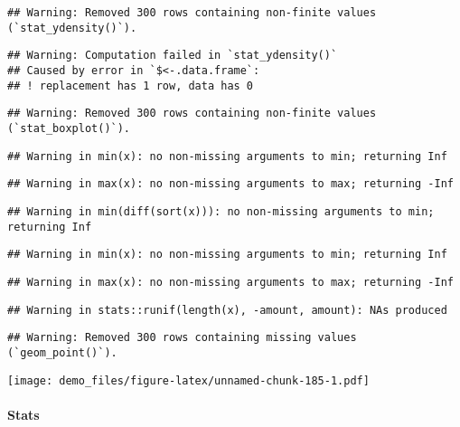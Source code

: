 \documentclass[]{book}
\let\oldparagraph\paragraph
\renewcommand{\paragraph}[1]{\oldparagraph{#1}\mbox{}}
\begin{document}
\begin{verbatim}
## Warning: Removed 300 rows containing non-finite values (`stat_ydensity()`).
\end{verbatim}

\begin{verbatim}
## Warning: Computation failed in `stat_ydensity()`
## Caused by error in `$<-.data.frame`:
## ! replacement has 1 row, data has 0
\end{verbatim}

\begin{verbatim}
## Warning: Removed 300 rows containing non-finite values (`stat_boxplot()`).
\end{verbatim}

\begin{verbatim}
## Warning in min(x): no non-missing arguments to min; returning Inf
\end{verbatim}

\begin{verbatim}
## Warning in max(x): no non-missing arguments to max; returning -Inf
\end{verbatim}

\begin{verbatim}
## Warning in min(diff(sort(x))): no non-missing arguments to min; returning Inf
\end{verbatim}

\begin{verbatim}
## Warning in min(x): no non-missing arguments to min; returning Inf
\end{verbatim}

\begin{verbatim}
## Warning in max(x): no non-missing arguments to max; returning -Inf
\end{verbatim}

\begin{verbatim}
## Warning in stats::runif(length(x), -amount, amount): NAs produced
\end{verbatim}

\begin{verbatim}
## Warning: Removed 300 rows containing missing values (`geom_point()`).
\end{verbatim}

\texttt{[image: demo\_files/figure-latex/unnamed-chunk-185-1.pdf]}

\hypertarget{stats-81}{%
\paragraph{Stats}\label{stats-81}}
\end{document}
